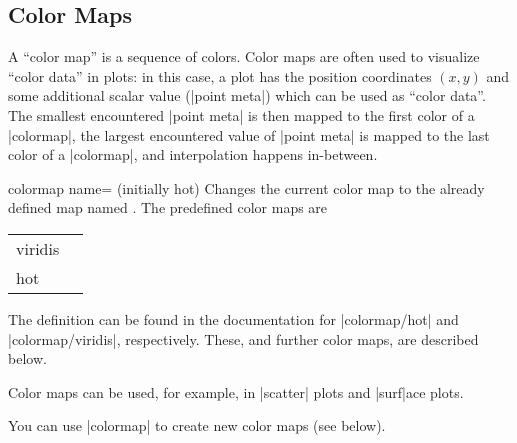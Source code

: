 \subsection{Color Maps}

A ``color map'' is a sequence of colors. Color maps are often used to visualize ``color data'' in plots: in this case, a plot has the position coordinates $(x,y)$ and some additional scalar value (|point meta|) which can be used as ``color data''. The smallest encountered |point meta| is then mapped to the first color of a |colormap|, the largest encountered value of |point meta| is mapped to the last color of a |colormap|, and interpolation happens in-between.

\label{pgfplots:colormap}
\begin{pgfplotskey}{colormap name= (initially hot)}
	Changes the current color map to the already defined map named . The predefined color maps are

	\begin{tabular}{>{\ttfamily}ll}
	viridis & \pgfplotsshowcolormap{viridis}\\
	hot & \pgfplotsshowcolormap{hot}\\
	\end{tabular}

	The definition can be found in the documentation for |colormap/hot| and |colormap/viridis|, respectively. 
	These, and further color maps, are described below.

	Color maps can be used, for example, in |scatter| plots and |surf|ace plots.

	You can use |colormap| to create new color maps (see below).
\end{pgfplotskey}

